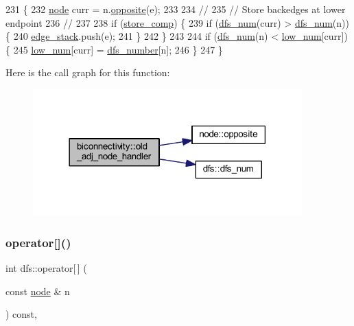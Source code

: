 \begin{DoxyCode}
231 \{
232     \mbox{\hyperlink{classnode}{node}} curr = n.\mbox{\hyperlink{classnode_a13dbd1809a33a5efede64a359e53a363}{opposite}}(e);
233 
234     \textcolor{comment}{//}
235     \textcolor{comment}{// Store backedges at lower endpoint}
236     \textcolor{comment}{//}
237 
238     \textcolor{keywordflow}{if} (\mbox{\hyperlink{classbiconnectivity_a989307b07f4a976649bd7551173bd564}{store\_comp}}) \{
239         \textcolor{keywordflow}{if} (\mbox{\hyperlink{classdfs_a315f16831a0bd333960e87e045cb37c8}{dfs\_num}}(curr) > \mbox{\hyperlink{classdfs_a315f16831a0bd333960e87e045cb37c8}{dfs\_num}}(n)) \{
240             \mbox{\hyperlink{classbiconnectivity_a524ba263fc35d13aab5078ebfe8f5307}{edge\_stack}}.push(e);
241         \}
242     \}
243 
244     \textcolor{keywordflow}{if} (\mbox{\hyperlink{classdfs_a315f16831a0bd333960e87e045cb37c8}{dfs\_num}}(n) < \mbox{\hyperlink{classbiconnectivity_ac5817e2122477ed591ef229c081745f3}{low\_num}}[curr]) \{
245         \mbox{\hyperlink{classbiconnectivity_ac5817e2122477ed591ef229c081745f3}{low\_num}}[curr] = \mbox{\hyperlink{classdfs_a99727f2274d6af63daae4f0518f3adbe}{dfs\_number}}[n];
246     \}
247 \}
\end{DoxyCode}
Here is the call graph for this function\+:\nopagebreak
\begin{figure}[H]
\begin{center}
\leavevmode
\includegraphics[width=294pt]{classbiconnectivity_a92228b87472140374dffea7d9f7ee20d_cgraph}
\end{center}
\end{figure}
\mbox{\label{classdfs_a014b90894a47fa5abb7f4e5030be2c3e}} 
\subsubsection{\texorpdfstring{operator[]()}{operator[]()}}
{\footnotesize\ttfamily int dfs\+::operator\mbox{[}$\,$\mbox{]} (\begin{DoxyParamCaption}\item[{const \mbox{\hyperlink{classnode}{node}} \&}]{n }\end{DoxyParamCaption}) const\hspace{0.3cm}{\ttfamily [inline]}, {\ttfamily [inherited]}}




